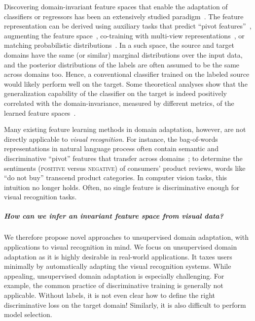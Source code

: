 Discovering domain-invariant feature spaces that enable the adaptation of classifiers or regressors has been an extensively studied paradigm~\cite{bendavid07domain,BlitzerEMNLP06Domain,BlitzerACL07domain,daume07easy,tca}. The feature representation can be derived using auxiliary tasks that predict ``pivot features''~\cite{ando05,BlitzerEMNLP06Domain}, augmenting the feature space~\cite{daume07easy,daume10co,li2012discriminative,gopalan2013learning}, co-training with multi-view representations~\cite{chen11cotrain}, or matching probabilistic distributions~\cite{tca}. In a such space, the source and target domains have the same (or similar) marginal distributions over the input data, and the posterior distributions of the labels are often assumed to be the same across domains too. Hence, a conventional classifier trained on the labeled source would  likely  perform  well on the target. Some theoretical analyses show that the generalization capability of the classifier on the target is indeed positively correlated with the domain-invariance, measured by different metrics, of the learned feature spaces~\cite{BenDavid10Adaptation,mansour09domain,mansour09multiple}.

Many existing feature learning methods in domain adaptation, however, are not directly applicable to {\em visual recognition}. For instance, the bag-of-words representations in natural language process often contain semantic and discriminative ``pivot'' features that transfer across domains~\cite{daume07easy,BlitzerEMNLP06Domain,BlitzerACL07domain,chen11cotrain}; to determine the sentiments (\textsc{positive} versus \textsc{negative}) of consumers' product reviews, words like ``do not buy'' transcend product categories. In computer vision tasks, this intuition no longer holds. Often, no single feature  is discriminative enough for visual recognition tasks.

\subparagraph{How can we infer an invariant feature space from \emph{visual} data?} 

We therefore propose novel approaches to unsupervised domain adaptation, with applications to visual recognition in mind. We focus on unsupervised domain adaptation as it is highly desirable in real-world applications. It taxes users minimally by automatically adapting the visual recognition systems. While appealing, unsupervised domain adaptation is especially challenging. For example, the common practice of discriminative training is generally not applicable. Without labels, it is not even clear how to define the right discriminative loss on the target domain! Similarly, it is also difficult to perform model selection.%


